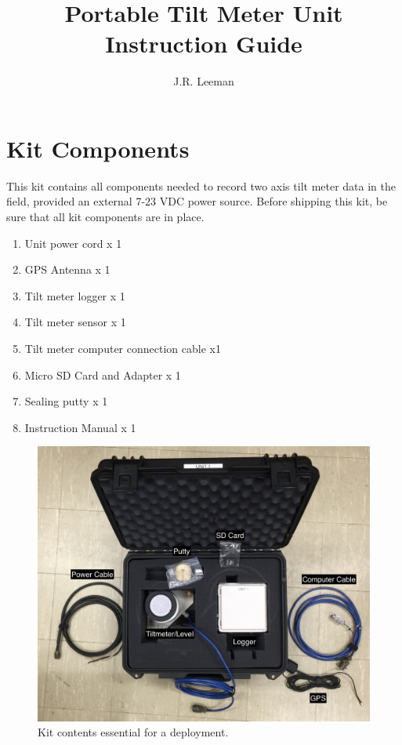 \documentclass[11pt]{article} %
\title{Portable Tilt Meter Unit Instruction Guide}
\author{J.R. Leeman}
\date{} %
\begin{document}
\maketitle

\section{Kit Components}

This kit contains all components needed to record two axis tilt meter data in the field, provided an external 7-23 VDC power source. Before shipping this kit, be sure that all kit components are in place.

\begin{enumerate}
\item Unit power cord x 1
\item GPS Antenna x 1
\item Tilt meter logger x 1
\item Tilt meter sensor x 1
\item Tilt meter computer connection cable x1
\item Micro SD Card and Adapter x 1
\item Sealing putty x 1
\item Instruction Manual x 1
\end{enumerate}

\begin{figure}
	\centering
		\includegraphics[scale=0.1]{kit_annotated.jpg}
   	\caption{Kit contents essential for a deployment.}
  	\label{kit}
\end{figure}
\end{document}

